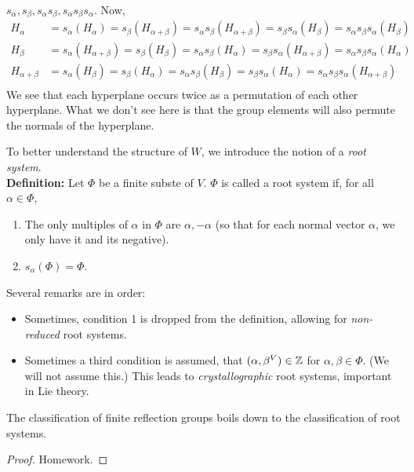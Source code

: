 $s_\alpha, s_\beta, s_\alpha s_\beta, s_\alpha s_\beta s_\alpha$. Now,
\begin{align*}
    H_\alpha
    &= s_\alpha(H_\alpha)
    = s_\beta (H_{\alpha+\beta})
    = s_\alpha s_\beta(H_{\alpha+\beta})
    = s_\beta s_\alpha (H_\beta)
    = s_\alpha s_\beta s_\alpha (H_\beta) \\
    H_\beta
    &= s_\alpha(H_{\alpha+\beta})
    = s_\beta (H_{\beta})
    = s_\alpha s_\beta(H_\alpha)
    = s_\beta s_\alpha (H_{\alpha+\beta})
    = s_\alpha s_\beta s_\alpha (H_{\alpha}) \\
    H_{\alpha+\beta}
    &= s_\alpha(H_{\beta})
    = s_\beta (H_{\alpha})
    = s_\alpha s_\beta(H_\beta)
    = s_\beta s_\alpha (H_{\alpha})
    = s_\alpha s_\beta s_\alpha (H_{\alpha+\beta}) \\
\end{align*}
We see that each hyperplane occurs twice as a permutation of each other
hyperplane. What we don't see here is that the group elements will also permute
the normals of the hyperplane.

To better understand the structure of $W$, we introduce the notion of a
{\em root system}.
\\

{\bf Definition:} Let $\Phi$ be a finite subste of $V$. $\Phi$ is called a root
system if, for all $\alpha \in \Phi$,
\begin{enumerate}
\item The only multiples of $\alpha$ in $\Phi$ are
$\alpha, -\alpha$ (so that for each normal vector $\alpha$, we only have it
and its negative).
\item $s_\alpha(\Phi) = \Phi$.
\end{enumerate}
Several remarks are in order:
\begin{itemize}
\item Sometimes, condition 1 is dropped from the definition, allowing for
{\em non-reduced} root systems.
\item Sometimes a third condition is assumed, that $(\alpha, \beta^V) \in \mathbb{Z}$
for $\alpha, \beta \in \Phi$. (We will not assume this.)
This leads to {\em crystallographic} root systems, important in Lie theory.
\end{itemize}

\begin{lemma}
The classification of finite reflection groups boils down to the classification
of root systems.
\end{lemma}

\begin{proof}
Homework.
\end{proof}
